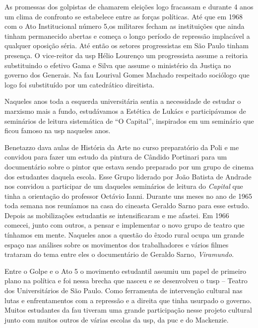 As promessas dos golpistas de chamarem eleições logo fracassam e durante
4 anos um clima de confronto se estabelece entre as forças políticas.
Até que em 1968 com o Ato Institucional número 5,os militares fecham as
instituições que ainda tinham permanecido abertas e começa o longo
período de repressão implacável a qualquer oposição séria. Até então os
setores progressistas em São Paulo tinham presença. O vice-reitor da {\sc usp}
Hélio Lourenço um progressista assume a reitoria substituindo o efetivo
Gama e Silva que assume o ministério da Justiça no governo dos Generais.
Na {\sc fau} Lourival Gomes Machado respeitado sociólogo que logo foi
substituído por um catedrático direitista.

Naqueles anos toda a esquerda universitária sentia a necessidade de
estudar o marxismo mais a fundo, estudávamos a Estética de Lukács e
participávamos de seminários de leitura sistemática de “O Capital”,
inspirados em um seminário que ficou famoso na {\sc usp} naqueles anos.

Benetazzo dava aulas de História da Arte no curso preparatório da Poli e
me convidou para fazer um estudo da pintura de Cândido Portinari para um
documentário sobre o pintor que estava sendo preparado por um grupo de
cinema dos estudantes daquela escola. Esse Grupo liderado por João
Batista de Andrade nos convidou a participar de um daqueles seminários
de leitura do {\it Capital} que tinha a orientação do professor Octávio
Ianni. Durante uns meses no ano de 1965 toda semana nos reuníamos na
casa do cineasta Geraldo Sarno para esse estudo. Depois as mobilizações
estudantis se intensificaram e me afastei. Em 1966 comecei, junto com
outros, a pensar e implementar o novo grupo de teatro que tínhamos em
mente. Naqueles anos a questão do êxodo rural ocupa um grande espaço nas
análises sobre os movimentos dos trabalhadores e vários filmes trataram
do tema entre eles o documentário de Geraldo Sarno, {\it Viramundo}.

Entre o Golpe e o Ato 5 o movimento estudantil assumiu um papel de
primeiro plano na política e foi nessa brecha que nasceu e se
desenvolveu o {\sc tusp} -- Teatro dos Universitários de São Paulo. Como
ferramenta de intervenção cultural nas lutas e enfrentamentos com a
repressão e a direita que tinha usurpado o governo. Muitos estudantes da
{\sc fau} tiveram uma grande participação nesse projeto cultural junto com
muitos outros de várias escolas da {\sc usp}, da {\sc puc} e do Mackenzie.

\subject{O {\cap tusp}}

